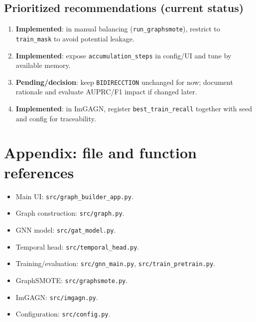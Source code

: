 \subsection{Prioritized recommendations (current status)}
\begin{enumerate}[leftmargin=*]
  \item \textbf{Implemented}: in manual balancing (\texttt{run\_graphsmote}), restrict to \texttt{train\_mask} to avoid potential leakage.
  \item \textbf{Implemented}: expose \texttt{accumulation\_steps} in config/UI and tune by available memory.
  \item \textbf{Pending/decision}: keep \texttt{BIDIRECCTION} unchanged for now; document rationale and evaluate AUPRC/F1 impact if changed later.
  \item \textbf{Implemented}: in ImGAGN, register \texttt{best\_train\_recall} together with seed and config for traceability.
\end{enumerate}

\section{Appendix: file and function references}
\begin{itemize}[leftmargin=*]
  \item Main UI: \texttt{src/graph\_builder\_app.py}.
  \item Graph construction: \texttt{src/graph.py}.
  \item GNN model: \texttt{src/gat\_model.py}.
  \item Temporal head: \texttt{src/temporal\_head.py}.
  \item Training/evaluation: \texttt{src/gnn\_main.py}, \texttt{src/train\_pretrain.py}.
  \item GraphSMOTE: \texttt{src/graphsmote.py}.
  \item ImGAGN: \texttt{src/imgagn.py}.
  \item Configuration: \texttt{src/config.py}.
\end{itemize}
